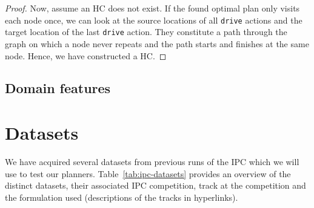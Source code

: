 \begin{proof}
Now, assume an HC does not exist. If the found optimal plan only visits each node once,
we can look at the source locations of all \verb+drive+ actions and the target
location of the last \verb+drive+ action. They constitute a path through the graph on which a node never repeats and the path starts and finishes at the same node.
Hence, we have constructed a HC.
\end{proof}

\subsection{Domain features}




















\section{Datasets}

We have acquired several datasets from previous runs of the IPC which we will use to test our planners.
Table~\ref{tab:ipc-datasets} provides an overview of the distinct datasets, their associated IPC competition, track at the competition and the formulation used (descriptions of the tracks in hyperlinks).


